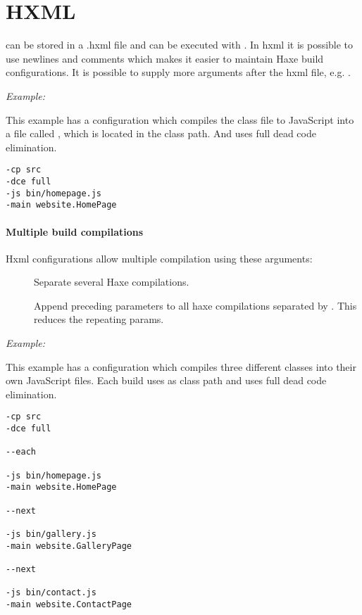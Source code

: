 \section{HXML}
\label{compiler-usage-hxml}

 can be stored in a .hxml file and can be executed with .
In hxml it is possible to use newlines and comments which makes it easier to maintain Haxe build configurations.
It is possible to supply more arguments after the hxml file, e.g. .

\emph{Example:}

This example has a configuration which compiles the class file  to JavaScript into a file called , which is located in the  class path. And uses full dead code elimination.

\begin{lstlisting}
-cp src
-dce full
-js bin/homepage.js
-main website.HomePage
\end{lstlisting}

\paragraph{Multiple build compilations}

Hxml configurations allow multiple compilation using these arguments:

\begin{description}
	\item[] Separate several Haxe compilations.
	\item[] Append preceding parameters to all haxe compilations separated by . This reduces the repeating params.
\end{description}

\emph{Example:}

This example has a configuration which compiles three different classes into their own JavaScript files. Each build uses  as class path and uses full dead code elimination.

\begin{lstlisting}
-cp src
-dce full

--each

-js bin/homepage.js
-main website.HomePage

--next  

-js bin/gallery.js
-main website.GalleryPage

--next  

-js bin/contact.js
-main website.ContactPage
\end{lstlisting}

